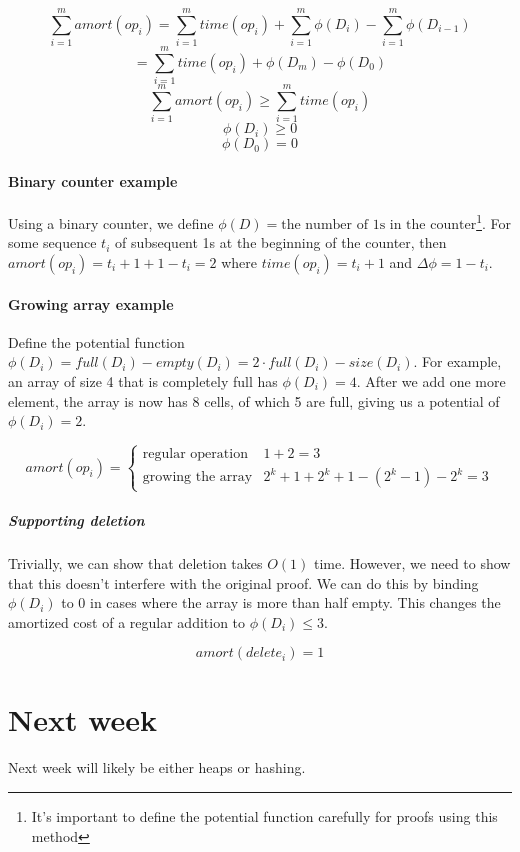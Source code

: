 \documentclass[a4paper]{article}
\begin{document}
\[\sum_{i=1}^mamort(op_i)=\sum_{i=1}^mtime(op_i)+\sum_{i=1}^m\phi(D_i)-\sum_{i=1}^m\phi(D_{i-1})\]
\[=\sum_{i=1}^mtime(op_i)+\phi(D_m)-\phi(D_0)\]
\[\sum_{i=1}^mamort(op_i)\ge\sum_{i=1}^mtime(op_i)\]
\[\phi(D_i)\ge0\]
\[\phi(D_0)=0\]

\paragraph{Binary counter example}
Using a binary counter, we define $\phi(D)=\text{the number of 1s in the counter}$\footnote{It's important to define the potential function carefully for proofs using this method}. For some sequence $t_i$ of subsequent 1s at the beginning of the counter, then $amort(op_i)=t_i+1+1-t_i=2$ where $time(op_i)=t_i+1$ and $\Delta\phi=1-t_i$.

\paragraph{Growing array example}
Define the potential function $\phi(D_i)=full(D_i)-empty(D_i)=2\cdot full(D_i)-size(D_i)$. For example, an array of size 4 that is completely full has $\phi(D_i)=4$. After we add one more element, the array is now has 8 cells, of which 5 are full, giving us a potential of $\phi(D_i)=2$.

\[
amort(op_i)=
\begin{cases}
\text{regular operation} & 1+2=3 \\
\text{growing the array} & 2^k+1+2^k+1-(2^k-1)-2^k=3
\end{cases}
\]

\subparagraph{Supporting deletion}
Trivially, we can show that deletion takes $O(1)$ time. However, we need to show that this doesn't interfere with the original proof. We can do this by binding $\phi(D_i)$ to 0 in cases where the array is more than half empty. This changes the amortized cost of a regular addition to $\phi(D_i)\le3$.

\[amort(delete_i)=1\]

\section{Next week}

Next week will likely be either heaps or hashing.
\end{document}
